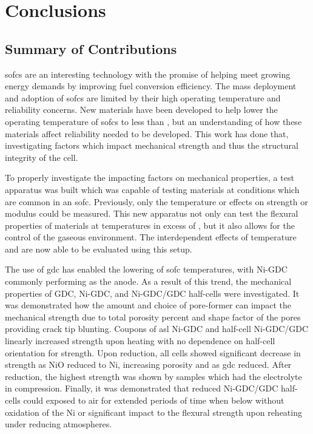 
\chapter{Conclusions}
\section{Summary of Contributions}

\Glspl{sofc} are an interesting technology with the promise of helping meet growing energy demands by improving fuel conversion efficiency.
The mass deployment and adoption of \glspl{sofc} are limited by their high operating temperature and reliability concerns.
New materials have been developed to help lower the operating temperature of \glspl{sofc} to less than , but an understanding of how these materials affect reliability needed to be developed.
This work has done that, investigating factors which impact mechanical strength and thus the structural integrity of the cell.

To properly investigate the impacting factors on mechanical properties, a test apparatus was built which was capable of testing materials at conditions which are common in an \gls{sofc}.
Previously, only the temperature or  effects on strength or modulus could be measured.
This new apparatus not only can test the flexural properties of materials at temperatures in excess of , but it also allows for the control of the gaseous environment.
The interdependent effects of temperature and  are now able to be evaluated using this setup.

The use of \gls{gdc} has enabled the lowering of \gls{sofc} temperatures, with Ni-GDC commonly performing as the anode.
As a result of this trend, the mechanical properties of GDC, Ni-GDC, and Ni-GDC/GDC half-cells were investigated.
It was demonstrated how the amount and choice of pore-former can impact the mechanical strength due to total porosity percent and shape factor of the pores providing crack tip blunting.
Coupons of \gls{asl} Ni-GDC and half-cell Ni-GDC/GDC linearly increased strength upon heating with no dependence on half-cell orientation for strength.
Upon reduction, all cells showed significant decrease in strength as NiO reduced to Ni, increasing porosity and as \gls{gdc} reduced.
After reduction, the highest strength was shown by samples which had the electrolyte in compression.
Finally, it was demonstrated that reduced Ni-GDC/GDC half-cells could exposed to air for extended periods of time when below  without oxidation of the Ni or significant impact to the flexural strength upon reheating under reducing atmospheres.


